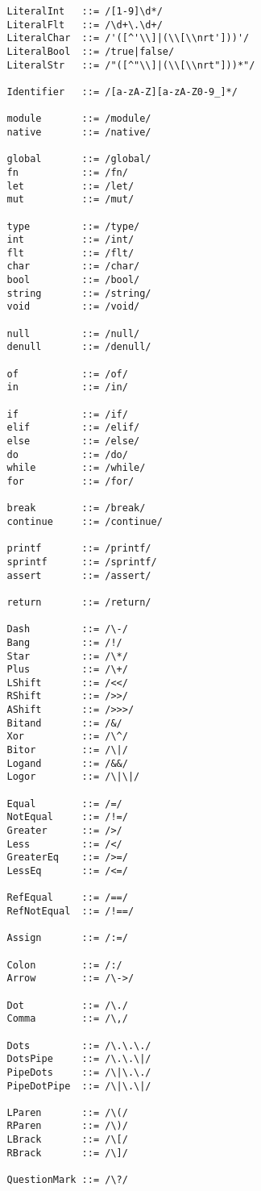 \documentclass{article}
\begin{document}
			\begin{small}\begin{verbatim}
				LiteralInt   ::= /[1-9]\d*/
				LiteralFlt   ::= /\d+\.\d+/
				LiteralChar  ::= /'([^'\\]|(\\[\\nrt']))'/
				LiteralBool  ::= /true|false/
				LiteralStr   ::= /"([^"\\]|(\\[\\nrt"]))*"/
				
				Identifier   ::= /[a-zA-Z][a-zA-Z0-9_]*/
				
				module       ::= /module/
				native       ::= /native/
				
				global       ::= /global/
				fn           ::= /fn/
				let          ::= /let/
				mut          ::= /mut/
				
				type         ::= /type/
				int          ::= /int/
				flt          ::= /flt/
				char         ::= /char/
				bool         ::= /bool/
				string       ::= /string/
				void         ::= /void/
				
				null         ::= /null/
				denull       ::= /denull/
				
				of           ::= /of/
				in           ::= /in/
				
				if           ::= /if/
				elif         ::= /elif/
				else         ::= /else/
				do           ::= /do/
				while        ::= /while/
				for          ::= /for/
				
				break        ::= /break/
				continue     ::= /continue/
				
				printf       ::= /printf/
				sprintf      ::= /sprintf/
				assert       ::= /assert/
				 
				return       ::= /return/
				
				Dash         ::= /\-/
				Bang         ::= /!/
				Star         ::= /\*/
				Plus         ::= /\+/
				LShift       ::= /<</
				RShift       ::= />>/
				AShift       ::= />>>/
				Bitand       ::= /&/
				Xor          ::= /\^/
				Bitor        ::= /\|/
				Logand       ::= /&&/
				Logor        ::= /\|\|/
				
				Equal        ::= /=/
				NotEqual     ::= /!=/
				Greater      ::= />/
				Less         ::= /</
				GreaterEq    ::= />=/
				LessEq       ::= /<=/
				
				RefEqual     ::= /==/
				RefNotEqual  ::= /!==/
				
				Assign       ::= /:=/
				
				Colon        ::= /:/
				Arrow        ::= /\->/
				
				Dot          ::= /\./
				Comma        ::= /\,/
				
				Dots         ::= /\.\.\./
				DotsPipe     ::= /\.\.\|/
				PipeDots     ::= /\|\.\./
				PipeDotPipe  ::= /\|\.\|/
				
				LParen       ::= /\(/
				RParen       ::= /\)/
				LBrack       ::= /\[/
				RBrack       ::= /\]/
				
				QuestionMark ::= /\?/
			\end{verbatim}\end{small}
			
\end{document}
